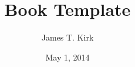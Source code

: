 \documentclass[12pt,a4paper]{book}
\title{\LaTeXe{} Book Template}
\author{James T. Kirk}
\date{May 1, 2014}
\begin{document}
\begin{frontmatter}

  \maketitle
  \let\cleardoublepage\clearpage
  
  
  

\end{frontmatter}
\begin{mainmatter}

  \tableofcontents
  \let\cleardoublepage\clearpage
  
  

\end{mainmatter}

\appendix

\begin{backmatter}
  \let\cleardoublepage\clearpage
  

\end{backmatter}
\end{document}

